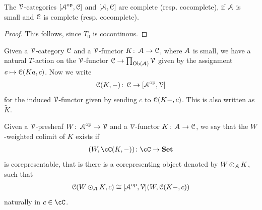 \documentclass[a4paper,11pt,oneside,openany]{scrbook}
\begin{document}
\begin{prop}
	The $\V$-categories $[\A^{\op},\C]$ and $[\A,\C]$ are complete (resp. cocomplete), if $\A$ is small and $\C$ is complete (resp. cocomplete).
\end{prop}

\begin{proof}
	This follows, since $T_{0}$ is cocontinous.
\end{proof}

\begin{defn}
	Given a $\V$-category $\C$ and a $\V$-functor $K \from \A \to \C$, where $\A$ is small, we have a natural $T$-action on the $\V$-functor
	$\C \to \prod_{\Ob(\A)}\V$ given by the assignment $c \mapsto \C(Ka,c)$. Now we write
	\begin{align*}
		\C(K,-) \from \C \to [\A^{\op},\V]
	\end{align*}
	for the induced $\V$-functor given by sending $c$ to $\C(K-,c)$. This is also written as $\widetilde{K}$.
\end{defn}

\begin{defn}
	Given a $\V$-presheaf $W\from \A^{\op} \to \V$ and a $\V$-functor $K \from \A \to \C$, we say that the $W$-weighted colimit of $K$ exists if
	\begin{align*}
		[\A^{\op},\V](W,\cC(K,-))\colon\cC\rightarrow\Set
	\end{align*}
	is corepresentable, that is there is a corepresenting object denoted by $W \copw_{\A} K$, such that
	\begin{align*}
		\C(W\copw_{\A} K, c) \iso [\A^{\op},\V](W,\C(K-,c))
	\end{align*}
	naturally in $c\in\cC$.
\end{defn}
\end{document}
